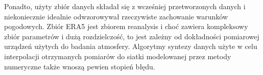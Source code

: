 Ponadto, użyty zbiór danych składał się z wcześniej przetworzonych danych i niekoniecznie idealnie
odwzorowywał rzeczywiste zachowanie warunków pogodowych. Zbiór ERA5 jest zbiorem reanalysis i choć
zawiera kompleksowy zbiór parametrów i dużą rozdzielczość, to jest zależny od dokładności pomiarowej
urządzeń użytych do badania atmosfery. Algorytmy syntezy danych użyte w celu interpolacji otrzymanych
pomiarów do siatki modelowanej przez metody numeryczne także wnoszą pewien stopień błędu.



